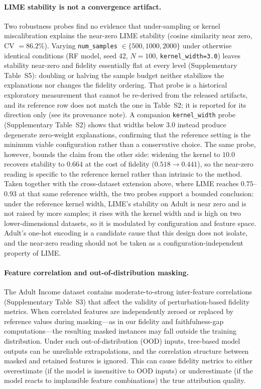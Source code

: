 \documentclass[10pt]{article}
\begin{document}
\paragraph{LIME stability is not a convergence artifact.}
Two robustness probes find no evidence that under-sampling or kernel
miscalibration explains the near-zero LIME stability (cosine similarity near
zero, CV $= 86.2\%$). Varying \texttt{num\_samples} $\in
\{500, 1000, 2000\}$ under otherwise identical conditions (RF model, seed
42, $N=100$, \texttt{kernel\_width=3.0}) leaves stability near-zero and
fidelity essentially flat at every level (Supplementary Table~S5):
doubling or halving the sample budget neither stabilizes the explanations
nor changes the fidelity ordering. That probe is a historical exploratory
measurement that cannot be re-derived from the released artifacts, and its
reference row does not match the one in Table~S2; it is reported for its
direction only (see its provenance note). A companion \texttt{kernel\_width}
probe (Supplementary Table~S2) shows that widths below $3.0$ instead
produce degenerate zero-weight explanations, confirming that the
reference setting is the minimum viable configuration rather than a
conservative choice. The same probe, however, bounds the claim from the
other side: widening the kernel to $10.0$ recovers stability to $0.664$
at the cost of fidelity ($0.518 \rightarrow 0.441$), so the near-zero
reading is specific to the reference kernel rather than intrinsic to the
method. Taken together with the cross-dataset extension above, where LIME
reaches $0.75$--$0.93$ at that same reference width, the two probes
support a bounded conclusion: under the reference kernel width, LIME's
stability on Adult is near zero and is not raised by more samples; it rises
with the kernel width and is high on two lower-dimensional datasets, so it
is modulated by configuration and feature space. Adult's one-hot encoding
is a candidate cause that this design does not isolate, and the near-zero
reading should not be taken as a configuration-independent property of
LIME.

\paragraph{Feature correlation and out-of-distribution masking.}
The Adult Income dataset contains moderate-to-strong inter-feature
correlations (Supplementary Table~S3) that affect the validity of
perturbation-based fidelity metrics. When correlated features are
independently zeroed or replaced by reference values during
masking---as in our fidelity and faithfulness-gap computations---the
resulting masked instances may fall outside the training distribution.
Under such out-of-distribution (OOD) inputs, tree-based model outputs can
be unreliable extrapolations, and the correlation structure between
masked and retained features is ignored. This can cause fidelity metrics
to either overestimate (if the model is insensitive to OOD inputs) or
underestimate (if the model reacts to implausible feature combinations)
the true attribution quality.
\end{document}
